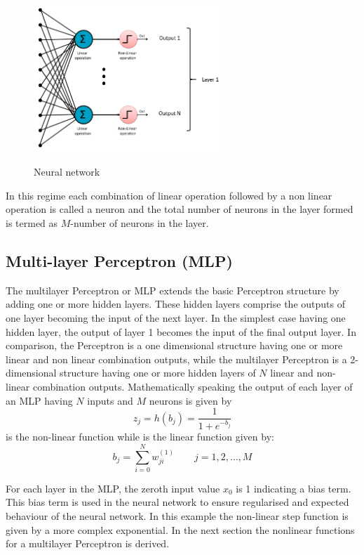 \begin{figure}
\centering
  \includegraphics[width=7cm]{thesis/images/ptron3.png}\\
  \caption{Neural network} \label{fig_3_2_nn}
\end{figure}

In this regime each combination of linear operation followed by a non linear operation is called a neuron and the total number of neurons in the layer formed is termed as $M$-number of neurons in the layer.

\subsection{Multi-layer Perceptron (MLP)}
The multilayer Perceptron or MLP extends the basic Perceptron structure by adding one or more hidden layers.  These hidden layers comprise the outputs of one layer becoming the input of the next layer. In the simplest case having one hidden layer, the output of layer 1 becomes the input of the final output layer.  In comparison, the Perceptron is a one dimensional structure having one or more linear and non linear combination outputs, while the multilayer Perceptron is a 2-dimensional structure having one or more hidden layers of $N$ linear and non-linear combination outputs.  Mathematically speaking the output of each layer of an MLP having $N$ inputs and $M$ neurons is given by
\begin{equation}
z_j=h(b_j)=\frac{1}{ 1+e^{-b_j}} 
\label{eqn_c3_nn_01}
\end{equation}
 is the non-linear function while  is the linear function given by:
\begin{equation}
b_j=\sum_{i=0}^Nw_{ji}^{(1)}\qquad j=1,2,\dots,M
\label{eqn_c3_nn_02}
\end{equation}

For each layer in the MLP, the zeroth input value $x_0$ is 1 indicating a bias term.  This bias term is used in the neural network to ensure regularised and expected behaviour of the neural network.  In this example the non-linear step function is given by a more complex exponential.  In the next section the nonlinear functions for a multilayer Perceptron is derived.

